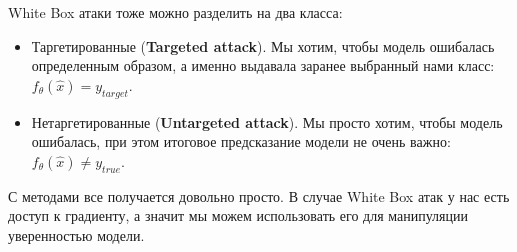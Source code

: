 \documentclass[12pt]{article}
\theoremstyle{definition} %
\theoremstyle{plain} %
\theoremstyle{remark} %
\begin{document}
White Box атаки тоже можно разделить на два класса:
\begin{itemize}
    \item Таргетированные (\textbf{Targeted attack}). Мы хотим, чтобы модель ошибалась определенным образом, а именно выдавала заранее выбранный нами класс: $f_\theta(\hat{x}) = y_{target}$.
    \item Нетаргетированные (\textbf{Untargeted attack}). Мы просто хотим, чтобы модель ошибалась, при этом итоговое предсказание модели не очень важно: $f_\theta(\hat{x}) \neq y_{true}$.
\end{itemize}

\pagebreak

С методами все получается довольно просто. В случае White Box атак у нас есть доступ к градиенту, а значит мы можем использовать его для манипуляции уверенностью модели. \\

 \\
\end{document}
